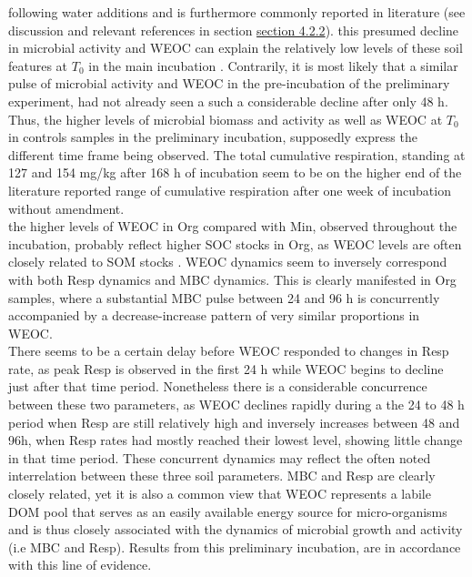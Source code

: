 \documentclass[12pt]{report}
\newcommand{\hiddenTxt}[1]{} %
\begin{document}
following water additions and is furthermore commonly reported in literature (see discussion and relevant references in section \hyperref[subsection_4.2.2]{section 4.2.2}). this presumed decline in microbial activity and WEOC can explain the relatively low levels of these soil features at $ T_0 $ in the main incubation . Contrarily, it is most likely that a similar pulse of microbial activity and WEOC in the pre-incubation of the preliminary experiment, had not already seen a such a considerable decline after only 48 h. Thus, the higher levels of microbial biomass and activity as well as WEOC at $ T_0 $ in controls samples in the preliminary incubation, supposedly express the different time frame being observed. 
			The total cumulative respiration, standing at 127 and 154 mg/kg after 168 h of incubation seem to be on the higher end of the literature reported range of cumulative respiration after one week of incubation without amendment\citep{ribeiro2010}.\\ 	
	 		the higher levels of WEOC in Org compared with Min, observed throughout the incubation, probably reflect higher SOC stocks in Org, as WEOC levels are often closely related to SOM stocks\citep{malik2013} . WEOC dynamics seem to inversely correspond with both Resp dynamics and MBC dynamics. This is clearly manifested in Org samples, where a substantial MBC pulse between 24 and 96 h is concurrently accompanied by a decrease-increase pattern of very similar proportions in WEOC.\\
	 		There seems to be a certain delay before WEOC responded to changes in Resp rate, as peak Resp is observed in the first 24 h while WEOC begins to decline just after that time period. Nonetheless there is a considerable concurrence between these two parameters, as WEOC declines rapidly during a the 24 to 48 h period when Resp are still relatively high and inversely increases between 48 and 96h, when Resp rates had mostly reached their lowest level, showing little change in that time period. These concurrent dynamics may reflect the often noted interrelation between these three soil parameters. MBC and Resp are clearly closely related, yet it is also a common view that WEOC represents a labile DOM pool that serves as an easily available energy source for micro-organisms and is thus closely associated with the dynamics of microbial growth and activity (i.e MBC and Resp)\citep{kemmitt2008, kaisermichael2012, guggenberger1998}. Results from this preliminary incubation, are in accordance with this line of evidence.\\
\end{document}
